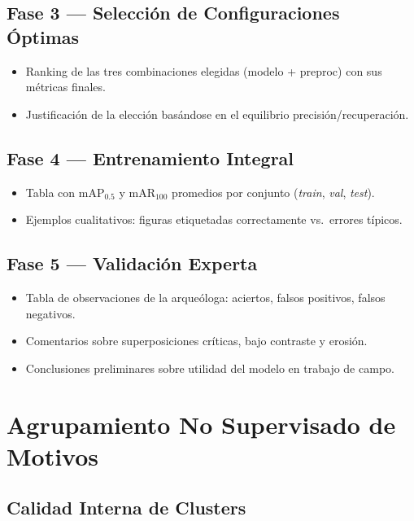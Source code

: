 \subsection{Fase 3 — Selección de Configuraciones Óptimas}
\begin{itemize}
  \item Ranking de las tres combinaciones elegidas (modelo + preproc) con sus métricas finales.
  \item Justificación de la elección basándose en el equilibrio precisión/recuperación.
\end{itemize}

\subsection{Fase 4 — Entrenamiento Integral}
\begin{itemize}
  \item Tabla con mAP$_{0.5}$ y mAR$_{100}$ promedios por conjunto (\textit{train}, \textit{val}, \textit{test}).
  \item Ejemplos cualitativos: figuras etiquetadas correctamente vs.\ errores típicos.
\end{itemize}

\subsection{Fase 5 — Validación Experta}
\begin{itemize}
  \item Tabla de observaciones de la arqueóloga: aciertos, falsos positivos, falsos negativos.
  \item Comentarios sobre superposiciones críticas, bajo contraste y erosión.
  \item Conclusiones preliminares sobre utilidad del modelo en trabajo de campo.
\end{itemize}

\section{Agrupamiento No Supervisado de Motivos}

\subsection{Calidad Interna de Clusters}

